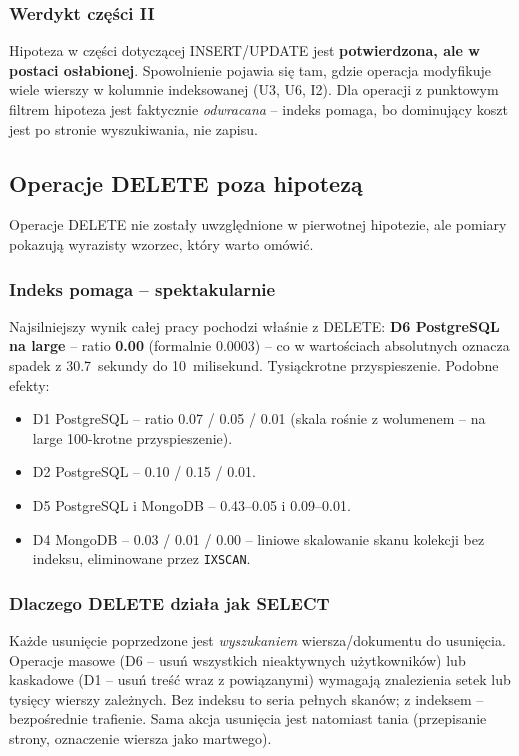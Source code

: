 \subsubsection*{Werdykt części II}

Hipoteza w części dotyczącej INSERT/UPDATE jest \textbf{potwierdzona,
ale w postaci osłabionej}. Spowolnienie pojawia się tam, gdzie operacja
modyfikuje wiele wierszy w kolumnie indeksowanej (U3, U6, I2). Dla
operacji z punktowym filtrem hipoteza jest faktycznie \emph{odwracana} --
indeks pomaga, bo dominujący koszt jest po stronie wyszukiwania,
nie zapisu.

\subsection{Operacje DELETE poza hipotezą}

Operacje DELETE nie zostały uwzględnione w pierwotnej hipotezie, ale
pomiary pokazują wyrazisty wzorzec, który warto omówić.

\subsubsection*{Indeks pomaga -- spektakularnie}

Najsilniejszy wynik całej pracy pochodzi właśnie z DELETE:
\textbf{D6 PostgreSQL na large} -- ratio \textbf{0.00} (formalnie
0.0003) -- co w wartościach absolutnych oznacza spadek z 30.7~sekundy
do 10~milisekund. Tysiąckrotne przyspieszenie. Podobne efekty:

\begin{itemize}
    \item D1 PostgreSQL -- ratio 0.07 / 0.05 / 0.01 (skala rośnie
    z wolumenem -- na large 100-krotne przyspieszenie).
    \item D2 PostgreSQL -- 0.10 / 0.15 / 0.01.
    \item D5 PostgreSQL i MongoDB -- 0.43--0.05 i 0.09--0.01.
    \item D4 MongoDB -- 0.03 / 0.01 / 0.00 -- liniowe skalowanie
    skanu kolekcji bez indeksu, eliminowane przez \texttt{IXSCAN}.
\end{itemize}

\subsubsection*{Dlaczego DELETE działa jak SELECT}

Każde usunięcie poprzedzone jest \emph{wyszukaniem} wiersza/dokumentu
do usunięcia. Operacje masowe (D6 -- usuń wszystkich nieaktywnych
użytkowników) lub kaskadowe (D1 -- usuń treść wraz z powiązanymi)
wymagają znalezienia setek lub tysięcy wierszy zależnych. Bez indeksu
to seria pełnych skanów; z indeksem -- bezpośrednie trafienie.
Sama akcja usunięcia jest natomiast tania (przepisanie strony,
oznaczenie wiersza jako martwego).

